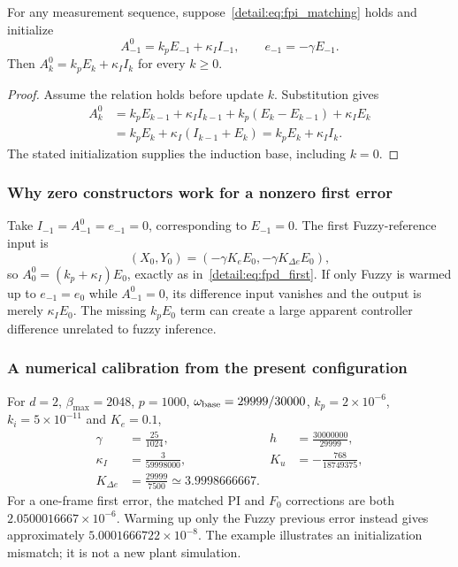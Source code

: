\begin{btdproposition}
\label{detail:prop:fpi_equivalence}
For any measurement sequence, suppose~\eqref{detail:eq:fpi_matching} holds and
initialize
\begin{equation}
 A^0_{-1}=k_pE_{-1}+\kappa_I I_{-1},\qquad e_{-1}=-\gamma E_{-1}.
 \label{detail:eq:fpi_initialization}
\end{equation}
Then
$A^0_k=k_pE_k+\kappa_I I_k$ for every $k\ge0$.
\end{btdproposition}
\begin{proof}
Assume the relation holds before update $k$. Substitution gives
\begin{align*}
 A^0_k
 &=k_pE_{k-1}+\kappa_I I_{k-1}
   +k_p(E_k-E_{k-1})+\kappa_I E_k\\
 &=k_pE_k+\kappa_I(I_{k-1}+E_k)
 =k_pE_k+\kappa_I I_k.
\end{align*}
The stated initialization supplies the induction base, including $k=0$.
\end{proof}

\subsubsection{Why zero constructors work for a nonzero first error}
Take $I_{-1}=A^0_{-1}=e_{-1}=0$, corresponding to $E_{-1}=0$.
The first Fuzzy-reference input is
\[
 (X_0,Y_0)=(-\gamma K_eE_0,-\gamma K_{\Delta e}E_0),
\]
so
$A^0_0=(k_p+\kappa_I)E_0$, exactly as in~\eqref{detail:eq:fpd_first}.
If only Fuzzy is warmed up to $e_{-1}=e_0$ while $A^0_{-1}=0$, its
difference input vanishes and the output is merely $\kappa_I E_0$.
The missing $k_pE_0$ term can create a large apparent controller difference
unrelated to fuzzy inference.

\subsubsection{A numerical calibration from the present configuration}
For $d=2$, $\beta_{\max}=2048$, $p=1000$, $\omega_{\rm base}=29999/30000$,
$k_p=2\times10^{-6}$, $k_i=5\times10^{-11}$ and $K_e=0.1$,
\begin{align}
 \gamma&=\frac{25}{1024},&h&=\frac{30000000}{29999},\nonumber\\
 \kappa_I&=\frac3{59998000},&
 K_u&=-\frac{768}{18749375},\nonumber\\
 K_{\Delta e}&=\frac{29999}{7500}
 \simeq3.9998666667.
 \label{detail:eq:fpd_example_gains}
\end{align}
For a one-frame first error, the matched PI and $F_0$ corrections are both
$2.0500016667\times10^{-6}$. Warming up only the Fuzzy previous error
instead gives approximately $5.0001666722\times10^{-8}$. The example
illustrates an initialization mismatch; it is not a new plant simulation.

